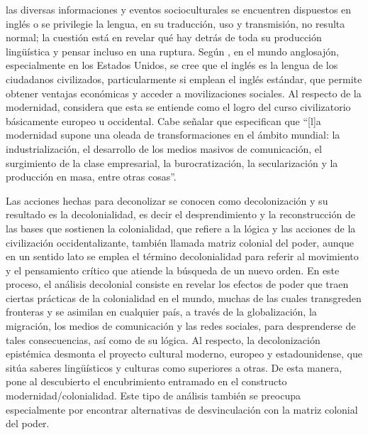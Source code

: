 \documentclass[spanish]{textolivre}
\begin{document}
las diversas informaciones y eventos socioculturales se encuentren dispuestos en inglés o se privilegie la lengua, en su traducción, uso y transmisión, no resulta normal; la cuestión está en revelar qué hay detrás de toda su producción lingüística y pensar incluso en una ruptura. Según \textcite{endo2010chapter}, en el mundo anglosajón, especialmente en los Estados Unidos, se cree que el inglés es la lengua de los ciudadanos civilizados, particularmente si emplean el inglés estándar, que permite obtener ventajas económicas y acceder a movilizaciones sociales. Al respecto de la modernidad, \textcite{quijano2000colonialidad} considera que esta se entiende como el logro del curso civilizatorio básicamente europeo u occidental. Cabe señalar que \textcite[p.406]{pedroza2006modernidad} especifican que “[l]a modernidad supone una oleada de transformaciones en el ámbito mundial: la industrialización, el desarrollo de los medios masivos de comunicación, el surgimiento de la clase empresarial, la burocratización, la secularización y la producción en masa, entre otras cosas”.

Las acciones hechas para deconolizar se conocen como decolonización y su resultado es la decolonialidad, es decir el desprendimiento y la reconstrucción de las bases que sostienen la colonialidad, que refiere a la lógica y las acciones de la civilización occidentalizante, también llamada matriz colonial del poder, aunque en un sentido lato se emplea el término decolonialidad para referir al movimiento y el pensamiento crítico que atiende la búsqueda de un nuevo orden. En este proceso, el análisis decolonial consiste en revelar los efectos de poder que traen ciertas prácticas de la colonialidad en el mundo, muchas de las cuales transgreden fronteras y se asimilan en cualquier país, a través de la globalización, la migración, los medios de comunicación y las redes sociales, para desprenderse de tales consecuencias, así como de su lógica. Al respecto, la decolonización epistémica desmonta el proyecto cultural moderno, europeo y estadounidense, que sitúa saberes lingüísticos y culturas como superiores a otras. De esta manera, pone al descubierto el encubrimiento entramado en el constructo modernidad/colonialidad. Este tipo de análisis también se preocupa especialmente por encontrar alternativas de desvinculación con la matriz colonial del poder.
\end{document}
